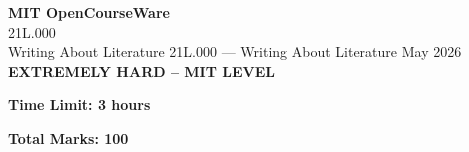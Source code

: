 \documentclass[12pt,a4paper]{exam}
\begin{document}
\begin{center}
{\LARGE \textbf{MIT OpenCourseWare}}\\21L.000\\Writing About Literature
\vspace{0.5cm}
{21L.000} --- {Writing About Literature}
\vspace{0.3cm}
May 2026
\vspace{0.3cm}
\textbf{EXTREMELY HARD -- MIT LEVEL}
\end{center}

\begin{center}
\textbf{Time Limit: 3 hours}
\end{center}

\begin{center}
\textbf{Total Marks: 100}
\end{center}

\vspace{0.5cm}
\end{document}
